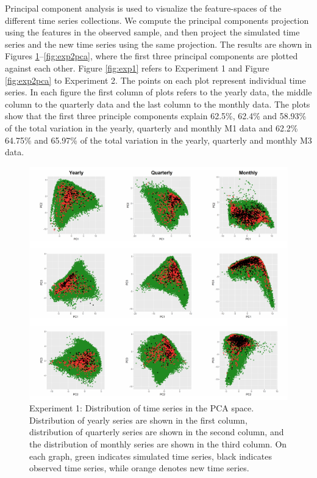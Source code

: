 \documentclass[11pt,a4paper,]{article}
\theoremstyle{definition}
\theoremstyle{definition}
\theoremstyle{definition}
\theoremstyle{remark}
\begin{document}
Principal component analysis is used to visualize the feature-spaces of
the different time series collections. We compute the principal
components projection using the features in the observed sample, and
then project the simulated time series and the new time series using the
same projection. The results are shown in Figures
\ref{fig:exp1pca}--\ref{fig:exp2pca}, where the first three principal
components are plotted against each other. Figure \ref{fig:exp1} refers
to Experiment 1 and Figure \ref{fig:exp2pca} to Experiment 2. The points
on each plot represent individual time series. In each figure the first
column of plots refers to the yearly data, the middle column to the
quarterly data and the last column to the monthly data. The plots show
that the first three principle components explain 62.5\%, 62.4\% and
58.93\% of the total variation in the yearly, quarterly and monthly M1
data and 62.2\% 64.75\% and 65.97\% of the total variation in the
yearly, quarterly and monthly M3 data.

\begin{figure}

{\centering \includegraphics[width=\textwidth]{figure/exp1pca-1} 

}

\caption{Experiment 1: Distribution of time series in the PCA space. Distribution of yearly series are shown in the first column, distribution of quarterly series are shown in the second column, and the distribution of monthly series are shown in the third column. On each graph, green indicates simulated time series, black indicates observed time series, while orange denotes new time series.}\label{fig:exp1pca}
\end{figure}
\end{document}
